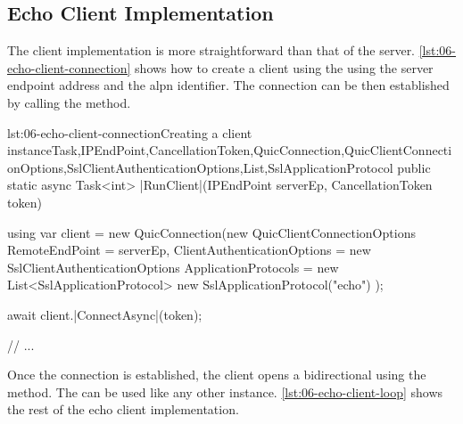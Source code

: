 \subsection{Echo Client Implementation}

The client implementation is more straightforward than that of the server.
\autoref{lst:06-echo-client-connection} shows how to create a client \QuicConnection{} using the
using the server endpoint address and the \gls{alpn} identifier. The connection can be then
established by calling the  method.

\begin{myListingCsharpNoPageBreak}{lst:06-echo-client-connection}{Creating a client \QuicConnection{} instance}{Task,IPEndPoint,CancellationToken,QuicConnection,QuicClientConnectionOptions,SslClientAuthenticationOptions,List,SslApplicationProtocol}{}
public static async Task<int> |RunClient|(IPEndPoint serverEp,
    CancellationToken token)
{
    using var client = new QuicConnection(new QuicClientConnectionOptions
    {
        RemoteEndPoint = serverEp,
        ClientAuthenticationOptions = new SslClientAuthenticationOptions
        {
            ApplicationProtocols = new List<SslApplicationProtocol>
            {
                new SslApplicationProtocol("echo")
            }
        }
    });

    await client.|ConnectAsync|(token);

    // ...
}
\end{myListingCsharpNoPageBreak}

Once the connection is established, the client opens a bidirectional \QuicStream{} using the
 method. The \QuicStream{} can be used like any other \Stream{}
instance. \autoref{lst:06-echo-client-loop} shows the rest of the echo client implementation.

